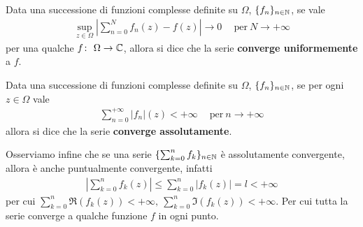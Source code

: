 \begin{definition}
	\label{defn:convergenza-uniforme-serie}
	Data una successione di funzioni complesse definite su $\Omega$, $\{f_n\}_{n\in\mathbb{N}}$, se vale 
	\begin{equation}
	\begin{aligned}
		\sup_{z \in \Omega} |\sum^{N}_{n=0}f_n(z) - f(z)| \to 0 \quad\ \text{per}\ N \to +\infty
	\end{aligned}
	\end{equation}
	per una qualche $f \colon\ \Omega \rightarrow \mathbb{C}$, allora si dice che la serie \textbf{converge uniformemente} a $f$.
\end{definition}	
	
\begin{definition}
	\label{defn:convergenza-assoluta}
	Data una successione di funzioni complesse definite su $\Omega$, $\{f_n\}_{n\in\mathbb{N}}$, se per ogni $z \in \Omega$ vale 
	\begin{equation}
	\begin{aligned}
		\sum^{+\infty}_{n=0} |f_n|(z) < +\infty \quad\ \text{per}\ n \to +\infty
	\end{aligned}
	\end{equation}
	allora si dice che la serie \textbf{converge assolutamente}.	
\end{definition}

\begin{remark}
	Osserviamo infine che se una serie $\{\sum^n_{k=0}f_k\}_{n \in \mathbb{N}}$ è assolutamente convergente, allora è anche puntualmente convergente, infatti
	\begin{equation}
	\begin{aligned}
		|\sum^n_{k=0} f_k(z)| \le \sum^n_{k=0} |f_k(z)| = l < +\infty
	\end{aligned}
	\end{equation} 
	per cui $\sum^n_{k=0} \Re(f_k(z)) < +\infty,\ \sum^n_{k=0} \Im(f_k(z)) < +\infty$. Per cui tutta la serie converge a qualche funzione $f$ in ogni punto.
\end{remark}


